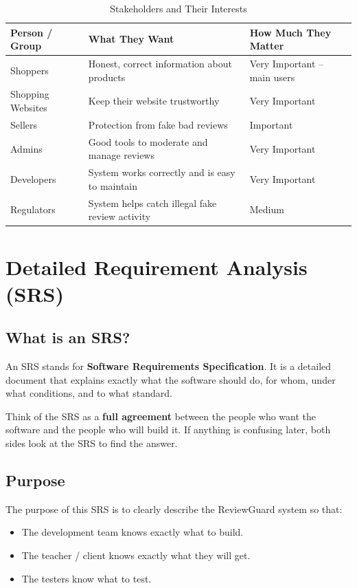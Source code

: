 \documentclass[10pt, a4paper]{report}
\begin{document}
\begin{table}[H]
\centering
\caption{Stakeholders and Their Interests}
\begin{tabularx}{\textwidth}{lXX}
\toprule
\textbf{Person / Group} & \textbf{What They Want} & \textbf{How Much They Matter} \\
\midrule
Shoppers & Honest, correct information about products & Very Important -- main users \\
Shopping Websites & Keep their website trustworthy & Very Important \\
Sellers & Protection from fake bad reviews & Important \\
Admins & Good tools to moderate and manage reviews & Very Important \\
Developers & System works correctly and is easy to maintain & Very Important \\
Regulators & System helps catch illegal fake review activity & Medium \\
\bottomrule
\end{tabularx}
\end{table}

\chapter{Detailed Requirement Analysis (SRS)}

\section{What is an SRS?}

An SRS stands for \textbf{Software Requirements Specification}. It is a detailed document that explains exactly what the software should do, for whom, under what conditions, and to what standard.

Think of the SRS as a \textbf{full agreement} between the people who want the software and the people who will build it. If anything is confusing later, both sides look at the SRS to find the answer.

\section{Purpose}

The purpose of this SRS is to clearly describe the ReviewGuard system so that:
\begin{itemize}
  \item The development team knows exactly what to build.
  \item The teacher / client knows exactly what they will get.
  \item The testers know what to test.
\end{itemize}
\end{document}
